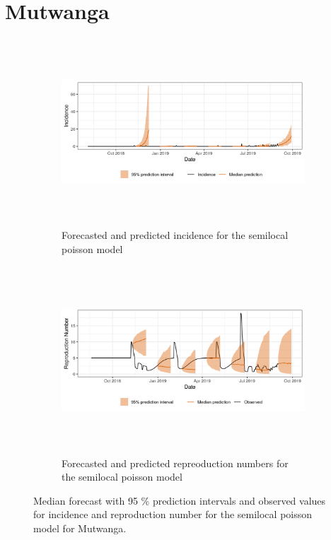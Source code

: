  \section{ Mutwanga }\begin{figure}[H]\begin{subfigure}{\textwidth}  \centering  \includegraphics[width=0.9\linewidth, height=7cm]{../output/Mutwanga_predictions.png}  \caption{Forecasted and predicted incidence for the semilocal poisson model}\end{subfigure}

\begin{subfigure}{\textwidth}  \centering  \includegraphics[width=0.9\linewidth, height=7cm]{../output/Mutwanga_Rs.png}  \caption{Forecasted and predicted repreoduction numbers for the semilocal poisson model}\end{subfigure}  \caption{Median forecast with 95 \% prediction intervals and observed values for incidence and reproduction number for the semilocal poisson model for Mutwanga.}\end{figure}

